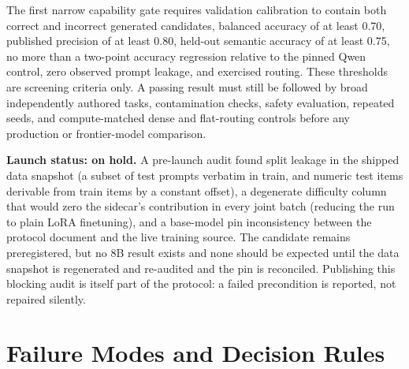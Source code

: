\documentclass[10pt,a4paper]{article}
\begin{document}
The first narrow capability gate requires validation calibration to contain
both correct and incorrect generated candidates, balanced accuracy of at
least 0.70, published precision of at least 0.80, held-out semantic accuracy
of at least 0.75, no more than a two-point accuracy regression relative to
the pinned Qwen control, zero observed prompt leakage, and exercised routing.
These thresholds are screening criteria only. A passing result must still be
followed by broad independently authored tasks, contamination checks, safety
evaluation, repeated seeds, and compute-matched dense and flat-routing
controls before any production or frontier-model comparison.

\textbf{Launch status: on hold.} A pre-launch audit found split leakage in
the shipped data snapshot (a subset of test prompts verbatim in train, and
numeric test items derivable from train items by a constant offset), a
degenerate difficulty column that would zero the sidecar's contribution in
every joint batch (reducing the run to plain LoRA finetuning), and a
base-model pin inconsistency between the protocol document and the live
training source. The candidate remains preregistered, but no 8B result exists
and none should be expected until the data snapshot is regenerated and
re-audited and the pin is reconciled. Publishing this blocking audit is
itself part of the protocol: a failed precondition is reported, not repaired
silently.

\section{Failure Modes and Decision Rules}
\label{sec:failure}
\end{document}
